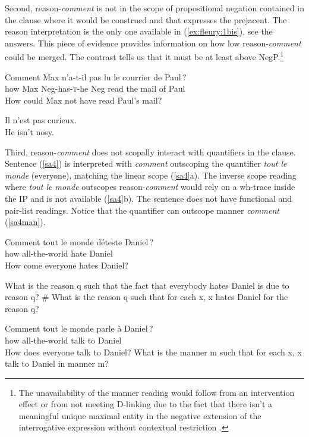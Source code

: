 \documentclass[output=paper,colorlinks,citecolor=brown,
]{langscibook}
\begin{document}
Second, reason-\textit{comment} is not in the scope of propositional negation contained
in the clause where it would be construed and that expresses the prejacent.
 The reason interpretation is the only one available in (\ref{ex:fleury:1bis}), see the   answers. 
  This piece of evidence provides information on how low reason-\textit{comment} could be merged. The contrast  tells us that it must be at least above NegP.\footnote{
 The unavailability of the manner reading would follow from an intervention effect \citep{Rizzi90} or  from not meeting D-linking due to the fact that there isn't a meaningful unique maximal entity in the negative extension of the interrogative expression
  without contextual restriction \citep{Rullmann95:thesis}.
 }
\begin{exe}
\ex\label{ex:fleury:1bis}
\gll Comment Max n'a-t-il pas lu le courrier de Paul\,?\\
how Max Neg-has-\textsc{t}-he Neg read the mail of Paul \\
\glt  How could Max not have read Paul's mail?
\begin{xlist}
\ex Il n'est pas curieux.
\\He isn't nosy.
\end{xlist}
\end{exe}

Third, reason-\textit{comment} does not scopally interact with quantifiers in the clause. Sentence  (\ref{sa4})
is interpreted with \textit{comment} outscoping the quantifier  \textit{tout le monde} (everyone), matching the linear scope (\ref{sa4}a). The inverse scope reading where \textit{tout le monde} outscopes  reason-\textit{comment} would rely on a wh-trace inside the IP and  is not available (\ref{sa4}b).
The sentence does not have functional and pair-list readings. 
Notice that the quantifier can outscope manner  \textit{comment} (\ref{sa4man}).
\begin{exe}
\ex\label{sa4}  \gll Comment {tout le monde} d\'eteste Daniel\,?    \\
how {all-the-world} hate Daniel \\ 
\glt How come everyone hates Daniel?
\begin{xlist}
\ex What is the reason q such that the fact that everybody hates Daniel is due to reason q? 
\ex \# What is the reason q such that for each x, x hates Daniel for the reason q? 
\end{xlist}
\ex\label{sa4man} 
\begin{xlist}
\ex \label{sa4bis}  \gll Comment {tout le monde} parle \`a Daniel\,?    \\
how {all-the-world} talk to Daniel \\ 
\glt How does everyone talk to Daniel? 
\ex \label{sa4manbis} What is the manner m such that for each x, x talk to Daniel in manner m?
\end{xlist}
\end{exe}
\end{document}
